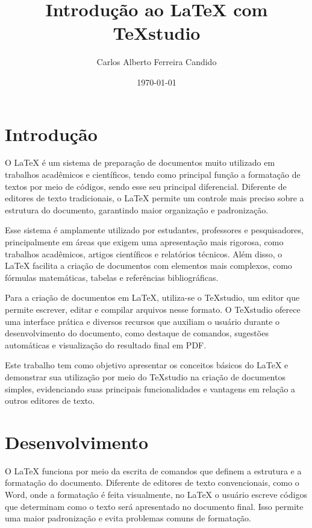 \documentclass[12pt]{article}
\title{Introdução ao LaTeX com TeXstudio}
\author{Carlos Alberto Ferreira Candido}
\date{\today}
\begin{document}
	
	\maketitle
	\newpage
	
	\section{Introdução}
	
	O LaTeX é um sistema de preparação de documentos muito utilizado em trabalhos acadêmicos e científicos, tendo como principal função a formatação de textos por meio de códigos, sendo esse seu principal diferencial. Diferente de editores de texto tradicionais, o LaTeX permite um controle mais preciso sobre a estrutura do documento, garantindo maior organização e padronização.
	
	Esse sistema é amplamente utilizado por estudantes, professores e pesquisadores, principalmente em áreas que exigem uma apresentação mais rigorosa, como trabalhos acadêmicos, artigos científicos e relatórios técnicos. Além disso, o LaTeX facilita a criação de documentos com elementos mais complexos, como fórmulas matemáticas, tabelas e referências bibliográficas.
	
	Para a criação de documentos em LaTeX, utiliza-se o TeXstudio, um editor que permite escrever, editar e compilar arquivos nesse formato. O TeXstudio oferece uma interface prática e diversos recursos que auxiliam o usuário durante o desenvolvimento do documento, como destaque de comandos, sugestões automáticas e visualização do resultado final em PDF.
	
	Este trabalho tem como objetivo apresentar os conceitos básicos do LaTeX e demonstrar sua utilização por meio do TeXstudio na criação de documentos simples, evidenciando suas principais funcionalidades e vantagens em relação a outros editores de texto.
	
	\newpage
	
	\section{Desenvolvimento}
	
	O LaTeX funciona por meio da escrita de comandos que definem a estrutura e a formatação do documento. Diferente de editores de texto convencionais, como o Word, onde a formatação é feita visualmente, no LaTeX o usuário escreve códigos que determinam como o texto será apresentado no documento final. Isso permite uma maior padronização e evita problemas comuns de formatação.
	
\end{document}
